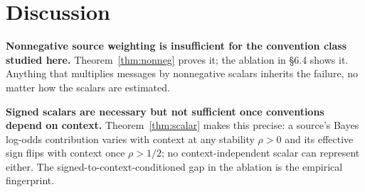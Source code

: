 \section{Discussion}

\textbf{Nonnegative source weighting is insufficient for the convention
class studied here.} Theorem~\ref{thm:nonneg} proves it; the ablation in
\S6.4 shows it. Anything that multiplies messages by nonnegative scalars
inherits the failure, no matter how the scalars are estimated.

\textbf{Signed scalars are necessary but not sufficient once conventions
depend on context.} Theorem~\ref{thm:scalar} makes this precise: a
source's Bayes log-odds contribution varies with context at any
stability $\rho > 0$ and its effective sign flips with context once
$\rho > 1/2$; no context-independent scalar can represent either. The signed-to-context-conditioned
gap in the ablation is the empirical fingerprint.

